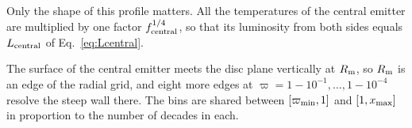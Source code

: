 Only the shape of this profile matters.
All the temperatures of the central emitter are multiplied by one factor $f_{\rm central}^{1/4}$, so that its luminosity from both sides equals $L_{\rm central}$ of Eq.~\eqref{eq:Lcentral}.

The surface of the central emitter meets the disc plane vertically at $R_{\rm m}$, so $R_{\rm m}$ is an edge of the radial grid, and eight more edges at $\varpi = 1 - 10^{-1}, \dots, 1 - 10^{-4}$ resolve the steep wall there.
The bins are shared between $[\varpi_{\rm min}, 1]$ and $[1, x_{\rm max}]$ in proportion to the number of decades in each.
